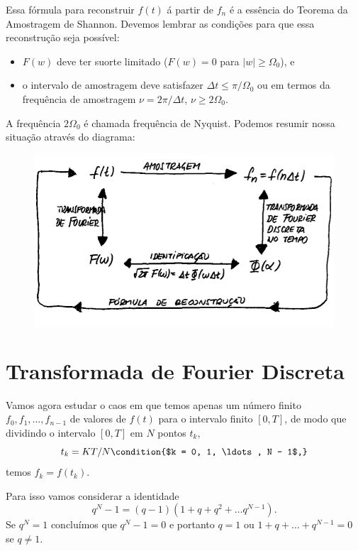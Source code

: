 Essa fórmula para reconstruir $f(t)$ á partir de $f_n$ é a essência do Teorema
da Amostragem de Shannon. Devemos lembrar as condições para que essa
reconstrução seja possível:
\begin{itemize}
  \item $F(w)$ deve ter suorte limitado ($F(w) = 0$ para $\lvert w \rvert \geq
    \Omega_0$), e
  \item o intervalo de amostragem deve satisfazer $\Delta t \leq \pi / \Omega_0$
    ou em termos da frequência de amostragem $\nu = 2 \pi / \Delta t$, $\nu \geq
    2 \Omega_0$.
\end{itemize}
A frequência $2 \Omega_0$ é chamada frequência de Nyquist. Podemos resumir nossa
situação através do diagrama:
\begin{figure}[htb]
  \centering
  \includegraphics{figuras/12-3}
\end{figure}

\section{Transformada de Fourier Discreta}
Vamos agora estudar o caos em que temos apenas um número finito $f_0, f_1,
\ldots, f_{n - 1}$ de valores de $f(t)$ para o intervalo finito $[0, T]$, de
modo que dividindo o intervalo $[0, T]$ em $N$ pontos $t_k$,
\begin{dmath*}
  t_k = K T / N \condition{$k = 0, 1, \ldots, N - 1$,}
\end{dmath*}
temos $f_k = f(t_k)$.

Para isso vamos considerar a identidade
\begin{dmath*}
  q^N - 1 = (q - 1) (1 + q + q^2 + \ldots q^{N - 1}).
\end{dmath*}
Se $q^N = 1$ concluímos que $q^N - 1 = 0$ e portanto $q = 1$ ou $1 + q + \ldots
+ q^{N - 1} = 0$ se $q \neq 1$.

